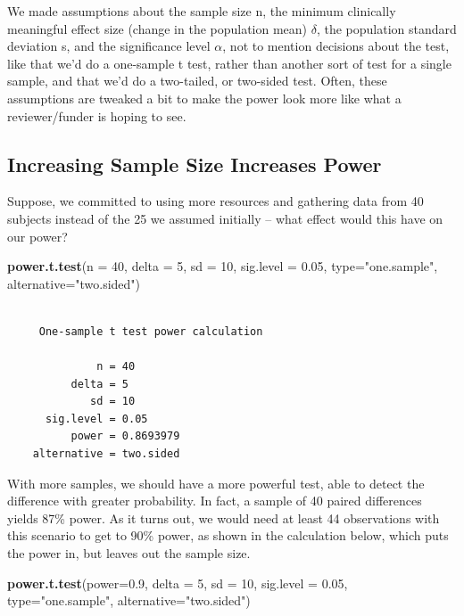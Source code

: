 \documentclass[
]{book}
\newenvironment{Shaded}{\begin{snugshade}}{\end{snugshade}}
\newcommand{\DataTypeTok}[1]{\textcolor[rgb]{0.13,0.29,0.53}{#1}}
\newcommand{\DecValTok}[1]{\textcolor[rgb]{0.00,0.00,0.81}{#1}}
\newcommand{\FloatTok}[1]{\textcolor[rgb]{0.00,0.00,0.81}{#1}}
\newcommand{\KeywordTok}[1]{\textcolor[rgb]{0.13,0.29,0.53}{\textbf{#1}}}
\newcommand{\NormalTok}[1]{#1}
\newcommand{\StringTok}[1]{\textcolor[rgb]{0.31,0.60,0.02}{#1}}
\begin{document}
We made assumptions about the sample size n, the minimum clinically meaningful effect size (change in the population mean) \(\delta\), the population standard deviation s, and the significance level \(\alpha\), not to mention decisions about the test, like that we'd do a one-sample t test, rather than another sort of test for a single sample, and that we'd do a two-tailed, or two-sided test. Often, these assumptions are tweaked a bit to make the power look more like what a reviewer/funder is hoping to see.

\hypertarget{increasing-sample-size-increases-power}{%
\subsection{Increasing Sample Size Increases Power}\label{increasing-sample-size-increases-power}}

Suppose, we committed to using more resources and gathering data from 40 subjects instead of the 25 we assumed initially -- what effect would this have on our power?

\begin{Shaded}
\begin{Highlighting}[]
\KeywordTok{power.t.test}\NormalTok{(}\DataTypeTok{n =} \DecValTok{40}\NormalTok{, }\DataTypeTok{delta =} \DecValTok{5}\NormalTok{, }\DataTypeTok{sd =} \DecValTok{10}\NormalTok{, }\DataTypeTok{sig.level =} \FloatTok{0.05}\NormalTok{, }
             \DataTypeTok{type=}\StringTok{"one.sample"}\NormalTok{, }\DataTypeTok{alternative=}\StringTok{"two.sided"}\NormalTok{)}
\end{Highlighting}
\end{Shaded}

\begin{verbatim}

     One-sample t test power calculation 

              n = 40
          delta = 5
             sd = 10
      sig.level = 0.05
          power = 0.8693979
    alternative = two.sided
\end{verbatim}

With more samples, we should have a more powerful test, able to detect the difference with greater probability. In fact, a sample of 40 paired differences yields 87\% power. As it turns out, we would need at least 44 observations with this scenario to get to 90\% power, as shown in the calculation below, which puts the power in, but leaves out the sample size.

\begin{Shaded}
\begin{Highlighting}[]
\KeywordTok{power.t.test}\NormalTok{(}\DataTypeTok{power=}\FloatTok{0.9}\NormalTok{, }\DataTypeTok{delta =} \DecValTok{5}\NormalTok{, }\DataTypeTok{sd =} \DecValTok{10}\NormalTok{, }\DataTypeTok{sig.level =} \FloatTok{0.05}\NormalTok{, }
             \DataTypeTok{type=}\StringTok{"one.sample"}\NormalTok{, }\DataTypeTok{alternative=}\StringTok{"two.sided"}\NormalTok{)}
\end{Highlighting}
\end{Shaded}
\end{document}
